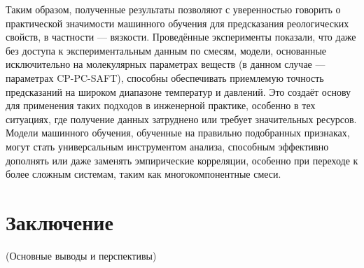 \documentclass[a4paper,12pt]{article}
\begin{document}
    Таким образом, полученные результаты позволяют с уверенностью говорить о практической значимости машинного обучения для предсказания реологических свойств, в частности — вязкости.
    Проведённые эксперименты показали, что даже без доступа к экспериментальным данным по смесям, модели, основанные исключительно на молекулярных параметрах веществ (в данном случае — параметрах CP-PC-SAFT), способны обеспечивать приемлемую точность предсказаний на широком диапазоне температур и давлений.
    Это создаёт основу для применения таких подходов в инженерной практике, особенно в тех ситуациях, где получение данных затруднено или требует значительных ресурсов. Модели машинного обучения, обученные на правильно подобранных признаках, могут стать универсальным инструментом анализа, способным эффективно дополнять или даже заменять эмпирические корреляции, особенно при переходе к более сложным системам, таким как многокомпонентные смеси.

\section*{Заключение}
(Основные выводы и перспективы)
\newpage

% 
\end{document}
